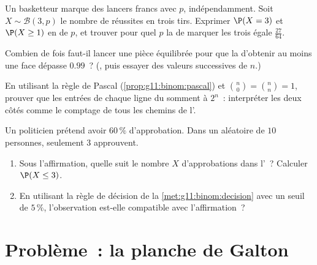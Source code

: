 \begin{exercise}[$\star\star$]\label{exo:g11:binom:8}
Un basketteur marque des lancers francs avec  $p$,
indépendamment. Soit $X \sim \mathcal B(3, p)$ le nombre de réussites en
trois tirs. Exprimer $\P(X = 3)$ et $\P(X \geq 1)$ en  de $p$,
et trouver pour quel $p$ la  de marquer les trois égale
$\frac{27}{64}$.
\end{exercise}

\begin{exercise}[$\star\star$]\label{exo:g11:binom:9}
Combien de fois faut-il lancer une pièce équilibrée pour que la
 d'obtenir au moins une face dépasse $0.99$~?
(, puis essayer des valeurs successives de $n$.)
\end{exercise}

\begin{exercise}[$\star\star$]\label{exo:g11:binom:10}
En utilisant la règle de Pascal (\cref{prop:g11:binom:pascal}) et
$\binom n0 = \binom nn = 1$, prouver que les entrées de chaque ligne du
 somment à $2^n$~: interpréter les deux côtés comme le
comptage de tous les chemins de l'.
\end{exercise}

\begin{exercise}[$\star\star\star$]\label{exo:g11:binom:11}
Un politicien prétend avoir $60\,\%$ d'approbation. Dans un 
aléatoire de $10$ personnes, seulement $3$ approuvent.
\begin{enumerate}
  \item Sous l'affirmation, quelle  suit le nombre $X$
        d'approbations dans l'~? Calculer $\P(X \leq 3)$.
  \item En utilisant la règle de décision de la
        \cref{met:g11:binom:decision} avec un seuil de $5\,\%$,
        l'observation est-elle compatible avec l'affirmation~?
\end{enumerate}
\end{exercise}

\section{Problème~: la planche de Galton}

